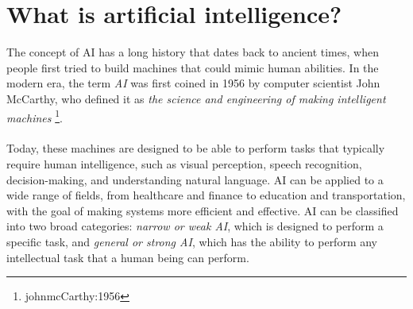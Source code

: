 \section{What is artificial intelligence?}
The concept of AI has a long history that dates back to ancient times,
when people first tried to build machines that could mimic human abilities.
In the modern era, the term \textit{AI}  was first coined in 1956 by computer scientist 
John McCarthy, who defined it as \textit{the science and engineering of making 
intelligent machines} \footnote{johnmcCarthy:1956}.
\\
\\
Today, these machines are designed to be able to perform tasks that typically 
require human intelligence, such as visual perception, speech recognition,
decision-making, and understanding natural language. AI can be applied to a wide
range of fields, from healthcare and finance to education and transportation,
with the goal of making systems more efficient and effective.
AI can be classified into two broad categories: \textit{narrow or weak AI},
which is designed to perform a specific task, and \textit{general or strong AI},
 which has the ability to perform any intellectual task that a human being can perform. \cite{KindsOfAI}


